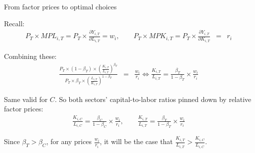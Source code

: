 \documentclass[notes,11pt, aspectratio=169, xcolor=table]{beamer}
\newenvironment{wideitemize}{\itemize\addtolength{\itemsep}{10pt}}{\enditemize}
\begin{document}
\begin{frame}{From factor prices to optimal choices}

        \begin{wideitemize}
            \item Recall:
            \begin{eqnarray*}
                P_T \times MPL_{i,T} = P_T \times  \frac{\partial Y_{i,T}}{\partial L_{i,T}} = w_i, \qquad P_T \times MPK_{i,T} =  P_T \times  \frac{\partial Y_{i,T}}{\partial K_{i,T}} &=&r_{i}
            \end{eqnarray*}

            \item<2-> Combining these:
                \begin{eqnarray*}
                \frac{P_{T} \times (1-\beta_T) \times \left( \frac{K_{i,T}}{L_{i,T}} \right)^{\beta_T}}{P_{T}  \times \beta_T \times \left( \frac{L_{i,T}}{K_{i,T}} \right)^{1-\beta_T}} &=& \frac{w_i}{r_i} \iff \frac{K_{i,T}}{L_{i,T}} = \frac{\beta_T}{1-\beta_T} \times \frac{w_i}{r_i} 
                \end{eqnarray*}

                \item<3-> Same valid for $C$. So both sectors' capital-to-labor ratios pinned down by relative factor prices:
\begin{eqnarray*}\label{eq: capital-labor}
    \frac{K_{i,C}}{L_{i,C}} = \frac{\beta_C}{1-\beta_C} \times \frac{w_i}{r_i}, \qquad \frac{K_{i,T}}{L_{i,T}} = \frac{\beta_T}{1-\beta_T} \times \frac{w_i}{r_i} 
\end{eqnarray*}        

    \item<4-> Since $\beta_T > \beta_C$, for any prices $\frac{w_i}{r_i}$, it will be the case that $\frac{K_{i,T}}{L_{i,T}} > \frac{K_{i,C}}{L_{i,C}} $.

\end{wideitemize}
\end{frame}
\end{document}
